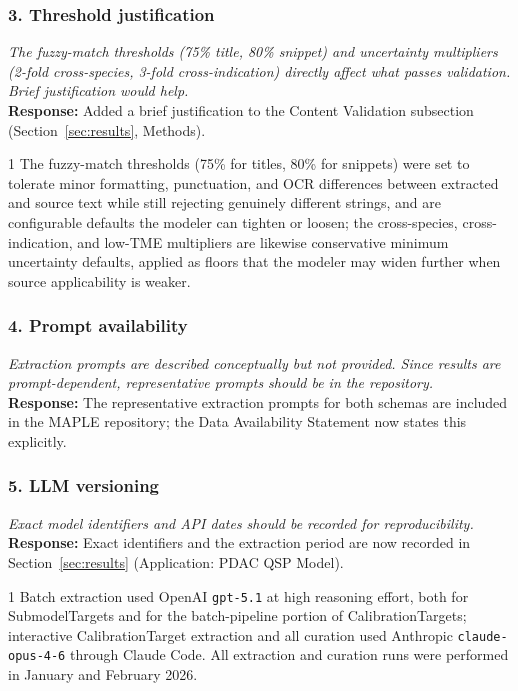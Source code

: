 \documentclass[11pt]{article}
\newcommand{\reviewer}[1]{\textcolor{reviewercolor}{\textit{#1}}}
\newcommand{\response}[1]{\textcolor{responsecolor}{\textbf{Response:} #1}}
\providecommand{\trackchanges}{1}
\newenvironment{revised}{\if1\trackchanges\color{blue}\fi}{}
\begin{document}
\subsubsection*{3. Threshold justification}
\reviewer{The fuzzy-match thresholds (75\% title, 80\% snippet) and uncertainty multipliers (2-fold cross-species, 3-fold cross-indication) directly affect what passes validation. Brief justification would help.}\\
\response{Added a brief justification to the Content Validation subsection (Section~\ref{sec:results}, Methods).}

\begin{revised}
The fuzzy-match thresholds (75\% for titles, 80\% for snippets) were set to tolerate minor formatting, punctuation, and OCR differences between extracted and source text while still rejecting genuinely different strings, and are configurable defaults the modeler can tighten or loosen; the cross-species, cross-indication, and low-TME multipliers are likewise conservative minimum uncertainty defaults, applied as floors that the modeler may widen further when source applicability is weaker.
\end{revised}

\subsubsection*{4. Prompt availability}
\reviewer{Extraction prompts are described conceptually but not provided. Since results are prompt-dependent, representative prompts should be in the repository.}\\
\response{The representative extraction prompts for both schemas are included in the MAPLE repository; the Data Availability Statement now states this explicitly.}

\subsubsection*{5. LLM versioning}
\reviewer{Exact model identifiers and API dates should be recorded for reproducibility.}\\
\response{Exact identifiers and the extraction period are now recorded in Section~\ref{sec:results} (Application: PDAC QSP Model).}

\begin{revised}
Batch extraction used OpenAI \texttt{gpt-5.1} at high reasoning effort, both for SubmodelTargets and for the batch-pipeline portion of CalibrationTargets; interactive CalibrationTarget extraction and all curation used Anthropic \texttt{claude-opus-4-6} through Claude Code. All extraction and curation runs were performed in January and February 2026.
\end{revised}
\end{document}
